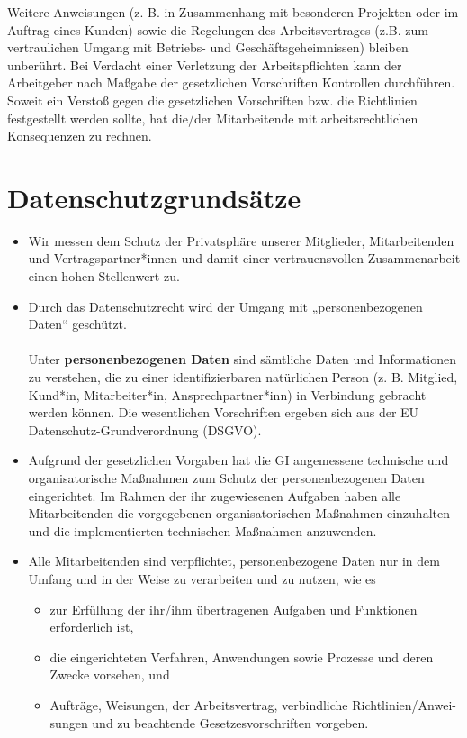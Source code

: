 \documentclass[a4paper, fontsize=11pt]{scrartcl}
\begin{document}
Weitere Anweisungen (z. B. in Zusammenhang mit besonderen Projekten oder im Auftrag eines Kunden) sowie die Regelungen des Arbeitsvertrages (z.B. zum vertraulichen Umgang mit Betriebs- und Geschäftsgeheimnissen) bleiben unberührt. Bei Verdacht einer Verletzung der Arbeitspflichten kann der Arbeitgeber nach Maßgabe der gesetzlichen Vorschriften Kontrollen durchführen. Soweit ein Verstoß gegen die gesetzlichen Vorschriften bzw. die Richtlinien festgestellt werden sollte, hat die/der Mitarbeitende mit arbeitsrechtlichen Konsequenzen zu rechnen.

\section{Datenschutzgrundsätze}
\begin{itemize}
  \item Wir messen dem Schutz der Privatsphäre unserer Mitglieder, Mitarbeitenden und Vertragspartner*innen und damit einer vertrauensvollen Zusammenarbeit einen hohen Stellenwert zu.
  \item Durch das Datenschutzrecht wird der Umgang mit „personenbezogenen Daten“ geschützt.\\
  \\
  Unter \textbf{personenbezogenen Daten} sind sämtliche Daten und Informationen zu verstehen, die zu einer identifizierbaren natürlichen Person (z. B. Mitglied, Kund*in, Mitarbeiter*in, Ansprechpartner*inn) in Verbindung gebracht werden können. Die wesentlichen Vorschriften ergeben sich aus der EU Datenschutz-Grundverordnung (DSGVO).
  \item Aufgrund der gesetzlichen Vorgaben hat die GI angemessene technische und organisatorische Maßnahmen zum Schutz der personenbezogenen Daten eingerichtet. Im Rahmen der ihr zugewiesenen Aufgaben haben alle Mitarbeitenden die vorgegebenen organisatorischen Maßnahmen einzuhalten und die implementierten technischen Maßnahmen anzuwenden.
  \item Alle Mitarbeitenden sind verpflichtet, personenbezogene Daten nur in dem Umfang und in der Weise zu verarbeiten und zu nutzen, wie es
  \begin{itemize}
    \item zur Erfüllung der ihr/ihm übertragenen Aufgaben und Funktionen erforderlich ist,
    \item die eingerichteten Verfahren, Anwendungen sowie Prozesse und deren Zwecke vorsehen, und
    \item Aufträge, Weisungen, der Arbeitsvertrag, verbindliche Richtlinien/Anwei-sungen und zu beachtende Gesetzesvorschriften vorgeben.

\end{itemize}
\end{itemize}
\end{document}
